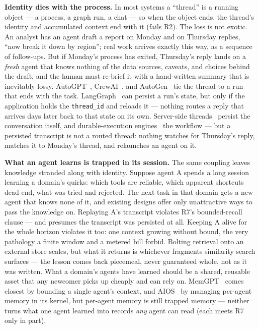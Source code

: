 \documentclass[10pt,twocolumn]{article}
\newcommand{\code}[1]{\texttt{\small #1}}
\begin{document}
\noindent\textbf{Identity dies with the process.} In most systems a ``thread'' is a
running object --- a process, a graph run, a chat --- so when the object ends, the
thread's identity and accumulated context end with it (fails R2). The loss is not
exotic. An analyst has an agent draft a report on Monday and on Thursday replies,
``now break it down by region''; real work arrives exactly this way, as a sequence of
follow-ups. But if Monday's process has exited, Thursday's reply lands on a
\emph{fresh} agent that knows nothing of the data sources, caveats, and choices behind
the draft, and the human must re-brief it with a hand-written summary that is
inevitably lossy. AutoGPT~\cite{autogpt}, CrewAI~\cite{crewai}, and
AutoGen~\cite{autogen} tie the thread to a run that ends with the task.
LangGraph~\cite{langgraph} can persist a run's state, but only if the application
holds the \code{thread\_id} and reloads it --- nothing routes a reply that arrives
days later back to that state on its own. Server-side threads~\cite{assistants}
persist the conversation itself, and durable-execution
engines~\cite{temporal,stepfns} the workflow --- but a persisted transcript is not a
routed thread: nothing watches for Thursday's reply, matches it to Monday's thread,
and relaunches an agent on it.

\noindent\textbf{What an agent learns is trapped in its session.} The same coupling
leaves knowledge stranded along with identity. Suppose agent A spends a long session
learning a domain's quirks: which tools are reliable, which apparent shortcuts
dead-end, what was tried and rejected. The next task in that domain gets a new
agent that knows none of it, and existing designs offer only unattractive ways to
pass the knowledge on. Replaying A's transcript violates R7's bounded-recall clause
--- and presumes the transcript was persisted at all. Keeping A alive for the whole
horizon violates it too: one context growing without bound, the very pathology a
finite window and a metered bill forbid. Bolting retrieval onto an external store
scales, but what it returns is whichever fragments similarity search surfaces --- the
lesson comes back piecemeal, never guaranteed whole, not as it was written. What a
domain's agents have learned should be a shared, reusable asset that any newcomer
picks up cheaply and can rely on. MemGPT~\cite{memgpt} comes closest by bounding a
single agent's context, and AIOS~\cite{aios} by managing per-agent memory in its
kernel, but per-agent memory is still trapped memory --- neither turns what one agent
learned into records \emph{any} agent can read (each meets R7 only in part).
\end{document}

